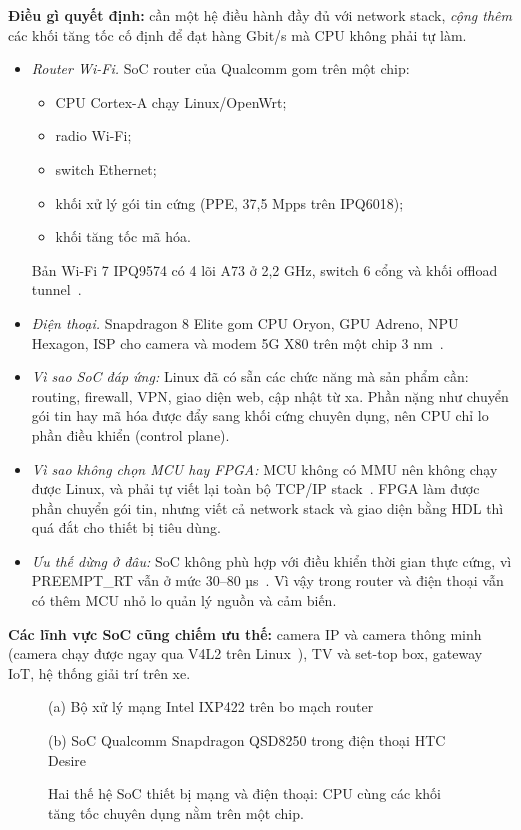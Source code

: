 \documentclass[11pt,a4paper]{article}
\begin{document}
\textbf{Điều gì quyết định:} cần một hệ điều hành đầy đủ với network stack, \emph{cộng thêm} các khối tăng tốc cố định để đạt hàng Gbit/s mà CPU không phải tự làm.
\begin{itemize}
\item \emph{Router Wi-Fi.} SoC router của Qualcomm gom trên một chip:
  \begin{itemize}
  \item CPU Cortex-A chạy Linux/OpenWrt;
  \item radio Wi-Fi;
  \item switch Ethernet;
  \item khối xử lý gói tin cứng (PPE, 37,5 Mpps trên IPQ6018);
  \item khối tăng tốc mã hóa.
  \end{itemize}
  Bản Wi-Fi 7 IPQ9574 có 4 lõi A73 ở 2,2 GHz, switch 6 cổng và khối offload tunnel~\cite{macnica,cnx-ipq}.
\item \emph{Điện thoại.} Snapdragon 8 Elite gom CPU Oryon, GPU Adreno, NPU Hexagon, ISP cho camera và modem 5G X80 trên một chip 3 nm~\cite{snapdragon}.
\item \emph{Vì sao SoC đáp ứng:} Linux đã có sẵn các chức năng mà sản phẩm cần: routing, firewall, VPN, giao diện web, cập nhật từ xa. Phần nặng như chuyển gói tin hay mã hóa được đẩy sang khối cứng chuyên dụng, nên CPU chỉ lo phần điều khiển (control plane).
\item \emph{Vì sao không chọn MCU hay FPGA:} MCU không có MMU nên không chạy được Linux, và phải tự viết lại toàn bộ TCP/IP stack~\cite{google-edge}. FPGA làm được phần chuyển gói tin, nhưng viết cả network stack và giao diện bằng HDL thì quá đắt cho thiết bị tiêu dùng.
\item \emph{Ưu thế dừng ở đâu:} SoC không phù hợp với điều khiển thời gian thực cứng, vì PREEMPT\_RT vẫn ở mức 30–80 µs~\cite{ac6}. Vì vậy trong router và điện thoại vẫn có thêm MCU nhỏ lo quản lý nguồn và cảm biến.
\end{itemize}

\textbf{Các lĩnh vực SoC cũng chiếm ưu thế:} camera IP và camera thông minh (camera chạy được ngay qua V4L2 trên Linux~\cite{appliedee-mpu}), TV và set-top box, gateway IoT, hệ thống giải trí trên xe.

\begin{figure}[htbp]
\centering
\begin{minipage}[b]{0.42\linewidth}\centering
  \small (a) Bộ xử lý mạng Intel IXP422 trên bo mạch router
\end{minipage}\hspace{0.04\linewidth}%
\begin{minipage}[b]{0.42\linewidth}\centering
  \small (b) SoC Qualcomm Snapdragon QSD8250 trong điện thoại HTC Desire
\end{minipage}
\caption{Hai thế hệ SoC thiết bị mạng và điện thoại: CPU cùng các khối tăng tốc chuyên dụng nằm trên một chip.}
\end{figure}
\end{document}
